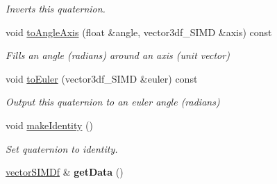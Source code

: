\begin{DoxyCompactItemize}
\begin{DoxyCompactList}\small\item\em Inverts this quaternion. \end{DoxyCompactList}\item 
void \hyperlink{classirr_1_1core_1_1quaternion_a24f05e33115743a16cd1f37d6549125f}{to\+Angle\+Axis} (float \&angle, vector3df\+\_\+\+S\+I\+MD \&axis) const \hypertarget{classirr_1_1core_1_1quaternion_a24f05e33115743a16cd1f37d6549125f}{}\label{classirr_1_1core_1_1quaternion_a24f05e33115743a16cd1f37d6549125f}

\begin{DoxyCompactList}\small\item\em Fills an angle (radians) around an axis (unit vector) \end{DoxyCompactList}\item 
void \hyperlink{classirr_1_1core_1_1quaternion_ae8a400c956520f53dbe80b7a7eb14398}{to\+Euler} (vector3df\+\_\+\+S\+I\+MD \&euler) const \hypertarget{classirr_1_1core_1_1quaternion_ae8a400c956520f53dbe80b7a7eb14398}{}\label{classirr_1_1core_1_1quaternion_ae8a400c956520f53dbe80b7a7eb14398}

\begin{DoxyCompactList}\small\item\em Output this quaternion to an euler angle (radians) \end{DoxyCompactList}\item 
void \hyperlink{classirr_1_1core_1_1quaternion_abe5607605f4138543669c27ada6b89e0}{make\+Identity} ()\hypertarget{classirr_1_1core_1_1quaternion_abe5607605f4138543669c27ada6b89e0}{}\label{classirr_1_1core_1_1quaternion_abe5607605f4138543669c27ada6b89e0}

\begin{DoxyCompactList}\small\item\em Set quaternion to identity. \end{DoxyCompactList}\item 
\hyperlink{classirr_1_1core_1_1vectorSIMDf}{vector\+S\+I\+M\+Df} \& {\bfseries get\+Data} ()\hypertarget{classirr_1_1core_1_1quaternion_ac385333109a6d9bc271977586c8c8b93}{}\label{classirr_1_1core_1_1quaternion_ac385333109a6d9bc271977586c8c8b93}

\end{DoxyCompactItemize}
